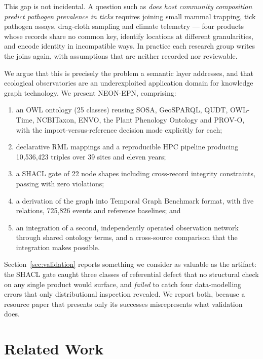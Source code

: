 This gap is not incidental. A question such as \emph{does host community
composition predict pathogen prevalence in ticks} requires joining small mammal
trapping, tick pathogen assays, drag-cloth sampling and climate telemetry ---
four products whose records share no common key, identify locations at
different granularities, and encode identity in incompatible ways. In practice
each research group writes the joins again, with assumptions that are neither
recorded nor reviewable.

We argue that this is precisely the problem a semantic layer addresses, and
that ecological observatories are an underexploited application domain for
knowledge graph technology. We present NEON-EPN, comprising:

\begin{enumerate}
  \item an OWL ontology (25 classes) reusing SOSA, GeoSPARQL, QUDT, OWL-Time,
        NCBITaxon, ENVO, the Plant Phenology Ontology and PROV-O, with the
        import-versus-reference decision made explicitly for each;
  \item declarative RML mappings and a reproducible HPC pipeline producing
        10{,}536{,}423 triples over 39 sites and eleven years;
  \item a SHACL gate of 22 node shapes including cross-record integrity
        constraints, passing with zero violations;
  \item a derivation of the graph into Temporal Graph Benchmark format, with
        five relations, 725{,}826 events and reference baselines; and
  \item an integration of a second, independently operated observation network
        through shared ontology terms, and a cross-source comparison that the
        integration makes possible.
\end{enumerate}

Section~\ref{sec:validation} reports something we consider as valuable as the
artifact: the SHACL gate caught three classes of referential defect that no
structural check on any single product would surface, and \emph{failed} to
catch four data-modelling errors that only distributional inspection revealed.
We report both, because a resource paper that presents only its successes
misrepresents what validation does.

\section{Related Work}

